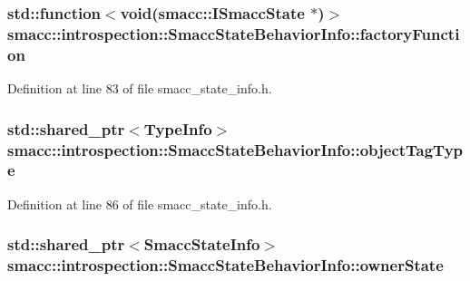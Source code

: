 \subsubsection[{\texorpdfstring{factory\+Function}{factoryFunction}}]{\setlength{\rightskip}{0pt plus 5cm}std\+::function$<$void({\bf smacc\+::\+I\+Smacc\+State} $\ast$)$>$ smacc\+::introspection\+::\+Smacc\+State\+Behavior\+Info\+::factory\+Function}\hypertarget{structsmacc_1_1introspection_1_1SmaccStateBehaviorInfo_a966cf5a5fe5cbe839be792b04e6c7368}{}\label{structsmacc_1_1introspection_1_1SmaccStateBehaviorInfo_a966cf5a5fe5cbe839be792b04e6c7368}


Definition at line 83 of file smacc\+\_\+state\+\_\+info.\+h.

\subsubsection[{\texorpdfstring{object\+Tag\+Type}{objectTagType}}]{\setlength{\rightskip}{0pt plus 5cm}std\+::shared\+\_\+ptr$<${\bf Type\+Info}$>$ smacc\+::introspection\+::\+Smacc\+State\+Behavior\+Info\+::object\+Tag\+Type}\hypertarget{structsmacc_1_1introspection_1_1SmaccStateBehaviorInfo_ae853ad3a28609fd83aa3d395d2e4c163}{}\label{structsmacc_1_1introspection_1_1SmaccStateBehaviorInfo_ae853ad3a28609fd83aa3d395d2e4c163}


Definition at line 86 of file smacc\+\_\+state\+\_\+info.\+h.

\subsubsection[{\texorpdfstring{owner\+State}{ownerState}}]{\setlength{\rightskip}{0pt plus 5cm}std\+::shared\+\_\+ptr$<${\bf Smacc\+State\+Info}$>$ smacc\+::introspection\+::\+Smacc\+State\+Behavior\+Info\+::owner\+State}\hypertarget{structsmacc_1_1introspection_1_1SmaccStateBehaviorInfo_a3a8978a085abb4e649ac4d3a13bd8257}{}\label{structsmacc_1_1introspection_1_1SmaccStateBehaviorInfo_a3a8978a085abb4e649ac4d3a13bd8257}


